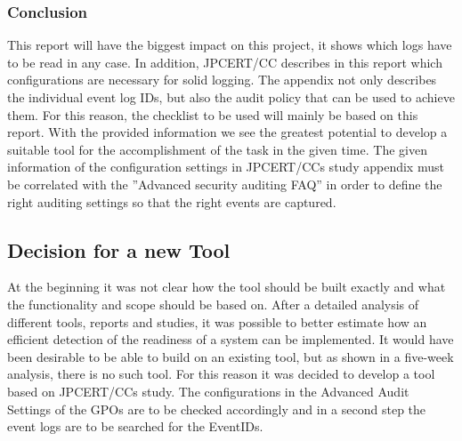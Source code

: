 \subsubsection{Conclusion}
This report will have the biggest impact on this project, it shows which logs have to be read in any case. In addition, JPCERT/CC describes in this report which configurations are necessary for solid logging. The appendix not only describes the individual event log IDs, but also the audit policy that can be used to achieve them. For this reason, the checklist to be used will mainly be based on this report. With the provided information we see the greatest potential to develop a suitable tool for the accomplishment of the task in the given time. The given information of the configuration settings in JPCERT/CCs study appendix must be correlated with the ''Advanced security auditing FAQ'' \cite{AdvancedSecurityAuditing} in order to define the right auditing settings so that the right events are captured.


\subsection{Decision for a new Tool}
At the beginning it was not clear how the tool should be built exactly and what the functionality and scope should be based on. After a detailed analysis of different tools, reports and studies, it was possible to better estimate how an efficient detection of the readiness of a system can be implemented. It would have been desirable to be able to build on an existing tool, but as shown in a five-week analysis, there is no such tool. For this reason it was decided to develop a tool based on JPCERT/CCs study. The configurations in the Advanced Audit Settings of the GPOs are to be checked accordingly and in a second step the event logs are to be searched for the EventIDs.

